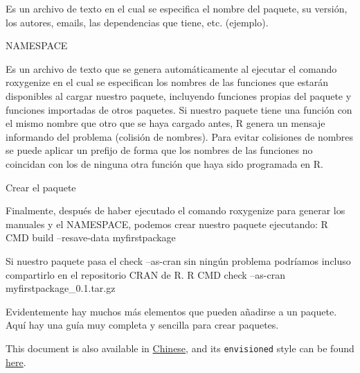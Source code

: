 \documentclass[]{tufte-handout}
\begin{document}
Es un archivo de texto en el cual se especifica el nombre del paquete,
su versión, los autores, emails, las dependencias que tiene, etc.
(ejemplo).

NAMESPACE

Es un archivo de texto que se genera automáticamente al ejecutar el
comando roxygenize en el cual se especifican los nombres de las
funciones que estarán disponibles al cargar nuestro paquete, incluyendo
funciones propias del paquete y funciones importadas de otros paquetes.
Si nuestro paquete tiene una función con el mismo nombre que otro que se
haya cargado antes, R genera un mensaje informando del problema
(colisión de nombres). Para evitar colisiones de nombres se puede
aplicar un prefijo de forma que los nombres de las funciones no
coincidan con los de ninguna otra función que haya sido programada en R.

Crear el paquete

Finalmente, después de haber ejecutado el comando roxygenize para
generar los manuales y el NAMESPACE, podemos crear nuestro paquete
ejecutando: R CMD build --resave-data myfirstpackage

Si nuestro paquete pasa el check --as-cran sin ningún problema podríamos
incluso compartirlo en el repositorio CRAN de R. R CMD check --as-cran
myfirstpackage\_0.1.tar.gz

Evidentemente hay muchos más elementos que pueden añadirse a un paquete.
Aquí hay una guía muy completa y sencilla para crear paquetes.

This document is also available in
\href{https://rstudio.github.io/tufte/cn/}{Chinese}, and its
\texttt{envisioned} style can be found
\href{https://rstudio.github.io/tufte/envisioned/}{here}.


\end{document}
